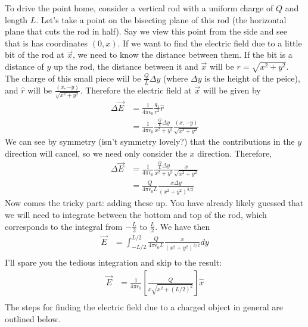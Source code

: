 \documentclass[nobib]{tufte-handout}
\begin{document}
To drive the point home, consider a vertical rod with a uniform charge of $Q$ and length $L$. 
Let's take a point on the bisecting plane of this rod (the horizontal plane that cuts the rod in half).
Say we view this point from the side and see that is has coordinates $(0, x)$. 
If we want to find the electric field due to a little bit of the rod at $\vec{x}$, 
we need to know the distance between them. If the bit is a distance of $y$ up the rod,
the distance between it and $\vec{x}$ will be $r = \sqrt{x^2 + y^2}$. 
The charge of this small piece will be $\frac{Q}{L} \Delta y$ (where $\Delta y$ is the 
height of the peice), and $\hat{r}$ 
will be $\frac{(x,-y)}{\sqrt{x^2+y^2}}$. 
Therefore the electric field at $\vec{x}$ will be given by 
\begin{align*}
    \Delta \vec{E} &= \frac{1}{4\pi \epsilon_0}\frac{q_1}{r^2}\hat{r} \\
    &= \frac{1}{4\pi \epsilon_0}\frac{\frac{Q}{L} \Delta y}{x^2+y^2}\frac{(x,-y)}{\sqrt{x^2+y^2}}
\end{align*}
We can see by symmetry (isn't symmetry lovely?) that the contributions in the $y$
direction will cancel, so we need only consider the $x$ direction. Therefore, 
\begin{align*}
    \Delta \vec{E} &= \frac{1}{4\pi \epsilon_0}\frac{\frac{Q}{L} \Delta y}{x^2+y^2}\frac{x}{\sqrt{x^2+y^2}} \\
    &= \frac{Q}{4\pi \epsilon_0 L}\frac{x \Delta y}{(x^2+y^2)^{3/2}}
\end{align*}
Now comes the tricky part: adding these up. You have already likely guessed that
we will need to integrate between the bottom and top of the rod, which
corresponds to the integral from $-\frac{L}{2}$ to $\frac{L}{2}$. We have then
\begin{align*}
    \vec{E} &= \int_{-L/2}^{L/2} \frac{Q}{4\pi \epsilon_0 L}\frac{x}{(x^2+y^2)^{3/2}} dy\\
\end{align*}
I'll spare you the tedious integration and skip to the result:
\begin{align*}
    \vec{E} &= \frac{1}{4 \pi \epsilon_0}\left[\frac{Q}{x\sqrt{x^2+(L/2)^2}}\right]\hat{x}\\
\end{align*}
The steps for finding the electric field due to a charged object in general are outlined below.
\end{document}
